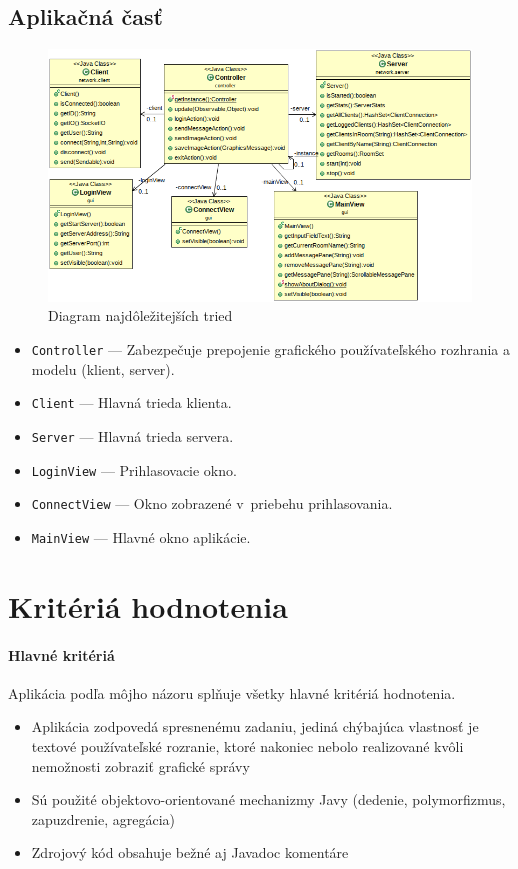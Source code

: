 \documentclass[11pt]{article}
\begin{document}
\subsection{Aplikačná časť}

\begin{figure}[h]
	\includegraphics[width=\textwidth]{UML-app.png}
	\caption{Diagram najdôležitejších tried}
\end{figure}

\begin{itemize}
	\item \texttt{Controller} --- Zabezpečuje prepojenie grafického používateľského
	      rozhrania a modelu (klient, server).
	\item \texttt{Client} --- Hlavná trieda klienta.
	\item \texttt{Server} --- Hlavná trieda servera.
	\item \texttt{LoginView} --- Prihlasovacie okno.
	\item \texttt{ConnectView} --- Okno zobrazené v~priebehu prihlasovania.
	\item \texttt{MainView} --- Hlavné okno aplikácie.
\end{itemize}

\pagebreak

\section{Kritériá hodnotenia}

\paragraph{Hlavné kritériá}
Aplikácia podľa môjho názoru splňuje všetky hlavné kritériá hodnotenia.
\begin{itemize}
	\item Aplikácia zodpovedá spresnenému zadaniu, jediná chýbajúca vlastnosť je
	      textové používateľské rozranie, ktoré nakoniec nebolo realizované kvôli
	      nemožnosti zobraziť grafické správy
	\item Sú použité objektovo-orientované mechanizmy Javy (dedenie,
	      polymorfizmus, zapuzdrenie, agregácia)
	\item Zdrojový kód obsahuje bežné aj Javadoc komentáre
\end{itemize}
\end{document}
